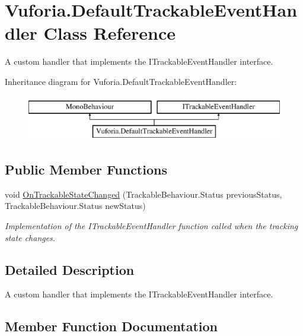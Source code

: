 \hypertarget{class_vuforia_1_1_default_trackable_event_handler}{}\section{Vuforia.\+Default\+Trackable\+Event\+Handler Class Reference}
\label{class_vuforia_1_1_default_trackable_event_handler}


A custom handler that implements the I\+Trackable\+Event\+Handler interface.  


Inheritance diagram for Vuforia.\+Default\+Trackable\+Event\+Handler\+:\begin{figure}[H]
\begin{center}
\leavevmode
\includegraphics[height=2.000000cm]{class_vuforia_1_1_default_trackable_event_handler}
\end{center}
\end{figure}
\subsection*{Public Member Functions}
\begin{DoxyCompactItemize}
\item 
void \hyperlink{class_vuforia_1_1_default_trackable_event_handler_a077509f4b77f7fdb82b0cc902a689115_a077509f4b77f7fdb82b0cc902a689115}{On\+Trackable\+State\+Changed} (Trackable\+Behaviour.\+Status previous\+Status, Trackable\+Behaviour.\+Status new\+Status)
\begin{DoxyCompactList}\small\item\em Implementation of the I\+Trackable\+Event\+Handler function called when the tracking state changes. \end{DoxyCompactList}\end{DoxyCompactItemize}


\subsection{Detailed Description}
A custom handler that implements the I\+Trackable\+Event\+Handler interface. 



\subsection{Member Function Documentation}
\hypertarget{class_vuforia_1_1_default_trackable_event_handler_a077509f4b77f7fdb82b0cc902a689115_a077509f4b77f7fdb82b0cc902a689115}{}

